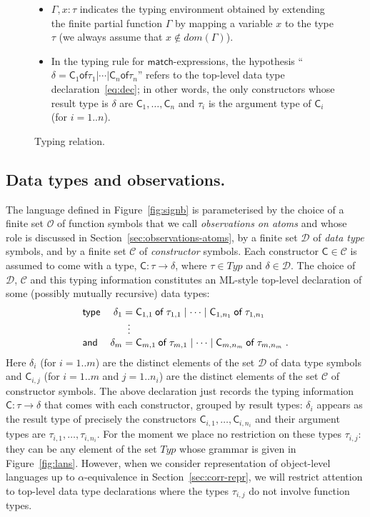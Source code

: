\documentclass{LMCS}
\theoremstyle{plain}
\theoremstyle{definition}
\newcommand{\ALT}{\mathrel{\kw{|}}}
\newcommand{\AND}{\kw{and}}
\newcommand{\CON}[1][C]{\kw{#1}}
\newcommand{\Con}{\mathcal{C}}
\newcommand{\dom}{\mathit{dom}}
\newcommand{\dty}{\delta}
\newcommand{\Dty}{\mathcal{D}}
\newcommand{\EQ}{\mathbin{\kw{=}}}
\newcommand{\FUNTY}{\mathbin{\rightarrow}}
\newcommand{\kw}[1]{\mathsf{#1}}
\newcommand{\MATCH}{\kw{match}}
\newcommand{\Obs}{\mathcal{O}}
\newcommand{\OF}{\mathbin{\kw{of}}}
\newcommand{\ofty}{:}
\newcommand{\OFTY}{\mathrel{\kw{:}}}
\newcommand{\ty}{\tau}
\newcommand{\Ty}{\mathit{Typ}}
\newcommand{\TYPE}{\kw{type}}
\newcommand{\vid}[1][x]{#1}
\begin{document}
\begin{figure}
\begin{itemize}
  \item $\Gamma,x\ofty\ty$ indicates the typing environment obtained
    by extending the finite partial function $\Gamma$ by mapping a
    variable $\vid$ to the type $\ty$ (we always assume that
    $\vid\notin\dom(\Gamma)$).
    
    \item In the typing rule for $\MATCH$-expressions, the hypothesis
    ``$\dty \EQ \CON_1\OF\ty_1\ALT\cdots\ALT\CON_n\OF\ty_n$'' refers
    to the top-level data type declaration~\eqref{eq:dec}; in other
    words, the only constructors whose result type is $\dty$ are
    $\CON_1,\ldots,\CON_n$ and $\ty_i$ is the argument type of
    $\CON_i$ (for $i=1..n$).

  \end{itemize}
  \caption{Typing relation.}
  \label{fig:typr}
\end{figure}


\subsection*{Data types and observations.}

The language defined in Figure~\ref{fig:signb} is parameterised by the
choice of a finite set $\Obs$ of function symbols that we call
\emph{observations on atoms} and whose role is discussed in
Section~\ref{sec:observations-atoms}, by a finite set $\Dty$ of
\emph{data type} symbols, and by a finite set $\Con$ of
\emph{constructor} symbols. Each constructor $\CON\in\Con$ is assumed
to come with a type, $\CON\ofty\ty\FUNTY\dty$, where $\ty\in\Ty$ and
$\dty\in\Dty$.  The choice of $\Dty$, $\Con$ and this typing
information constitutes an ML-style top-level declaration of some
(possibly mutually recursive) data types:
\begin{equation}
  \label{eq:dec}
  \begin{array}{lr@{\;}c@{\;}l}
    \TYPE & \dty_1 & \EQ & 
    \CON_{1,1}\OF\ty_{1,1} \ALT \cdots \ALT \CON_{1,n_1}\OF\ty_{1,n_1}\\
    & & \vdots & \\
    \AND & \dty_m & \EQ & 
    \CON_{m,1}\OF\ty_{m,1} \ALT \cdots \ALT \CON_{m,n_m}\OF\ty_{m,n_m}\;.
  \end{array}
\end{equation}
Here $\dty_i$ (for $i=1..m$) are the distinct elements of the set
$\Dty$ of data type symbols and $\CON_{i,j}$ (for $i=1..m$ and
$j=1..n_i$) are the distinct elements of the set $\Con$ of constructor
symbols. The above declaration just records the typing information
$\CON\OFTY\ty\FUNTY\dty$ that comes with each constructor, grouped by
result types: $\dty_i$ appears as the result type of precisely the
constructors $\CON_{i,1},\ldots,\CON_{i,n_i}$ and their argument types
are $\ty_{i,1},\ldots,\ty_{i,n_i}$. For the moment we place no
restriction on these types $\ty_{i,j}$: they can be any element of the
set $\Ty$ whose grammar is given in Figure~\ref{fig:lans}. However,
when we consider representation of object-level languages up to
$\alpha$-equivalence in Section~\ref{sec:corr-repr}, we will restrict
attention to top-level data type declarations where the types
$\ty_{i,j}$ do not involve function types.
\end{document}
